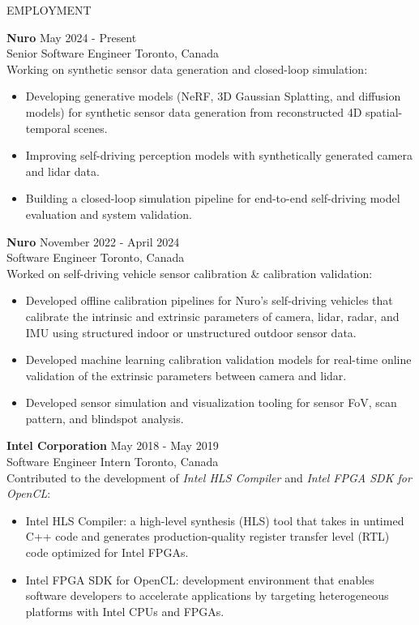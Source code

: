 \documentclass{cv}
\begin{document}
\begin{rSection}{EMPLOYMENT}
  \item \textbf{Nuro} \hfill {May 2024 - Present}\\
  Senior Software Engineer \hfill Toronto, Canada\\
  Working on synthetic sensor data generation and closed-loop simulation:
  \vspace{-0.5em}
  \begin{itemize}[noitemsep,topsep=0pt]
    \item Developing generative models (NeRF, 3D Gaussian Splatting, and diffusion models) for synthetic sensor data generation from reconstructed 4D spatial-temporal scenes.
    \item Improving self-driving perception models with synthetically generated camera and lidar data.
    \item Building a closed-loop simulation pipeline for end-to-end self-driving model evaluation and system validation.
  \end{itemize}

  \item \textbf{Nuro} \hfill {November 2022 - April 2024}\\
  Software Engineer \hfill Toronto, Canada\\
  Worked on self-driving vehicle sensor calibration \& calibration validation:
  \vspace{-0.5em}
  \begin{itemize}[noitemsep,topsep=0pt]
    \item Developed offline calibration pipelines for Nuro's self-driving vehicles that calibrate the intrinsic and extrinsic parameters of camera, lidar, radar, and IMU using structured indoor or unstructured outdoor sensor data.
    \item Developed machine learning calibration validation models for real-time online validation of the extrinsic parameters between camera and lidar.
    \item Developed sensor simulation and visualization tooling for sensor FoV, scan pattern, and blindspot analysis.
  \end{itemize}

  \item \textbf{Intel Corporation}  \hfill {May 2018 - May 2019}\\
  Software Engineer Intern \hfill Toronto, Canada\\
  Contributed to the development of \textit{Intel HLS Compiler} and \textit{Intel FPGA SDK for OpenCL}:
  \vspace{-0.5em}
  \begin{itemize}[noitemsep,topsep=0pt]
    \item Intel HLS Compiler: a high-level synthesis (HLS) tool that takes in untimed C++ code and generates production-quality register transfer level (RTL) code optimized for Intel FPGAs.
    \item Intel FPGA SDK for OpenCL: development environment that enables software developers to accelerate applications by targeting heterogeneous platforms with Intel CPUs and FPGAs.
  \end{itemize}
\end{rSection}
\end{document}
